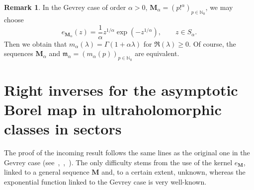 \documentclass[11pt,a4paper,leqno]{article}
\theoremstyle{plain}
\theoremstyle{definition}
\newtheorem{rem}[theo]{Remark}
\def\N{\mathbb{N}}
\def\a{\alpha}
\def\bM{\boldsymbol{M}}
\begin{document}
\begin{rem}
In the Gevrey case of order $\a>0$, $\bM_{\a}=(p!^{\a})_{p\in\N_0}$, we may choose
$$
e_{\bM_{\a}}(z)=\frac{1}{\a}z^{1/\a}\exp(-z^{1/\a}),\qquad z\in S_{\a}.
$$
Then we obtain that $m_{\a}(\lambda)=\Gamma(1+\a \lambda)$ for $\Re(\lambda)\ge 0$. Of course, the sequences $\bM_{\a}$ and $\mathfrak{m}_{\a}=(m_{\a}(p))_{p\in\N_0}$ are equivalent.
\end{rem}



\section{Right inverses for the asymptotic Borel map in ultraholomorphic classes in sectors}\label{sectRightInver1var}

The proof of the incoming result follows the same lines as the original one in the Gevrey case (see~\cite{to},~\cite{ca},~\cite[Thm.\ 4.1]{javier}). The only difficulty stems from the use of the kernel $e_{\bM}$, linked to a general sequence $\bM$ and, to a certain extent, unknown, whereas the exponential function linked to the Gevrey case is very well-known.
\end{document}
